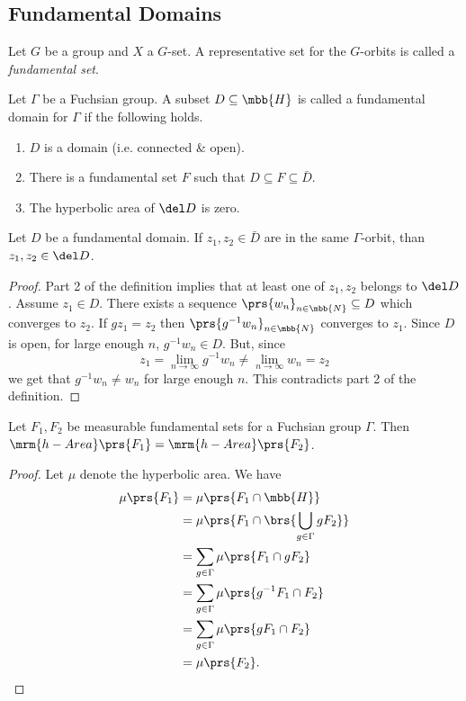 \documentclass[10pt, twoside]{book}
\begin{document}
\subsection{Fundamental Domains}

\begin{definition}
Let $G$ be a group and $X$ a $G$-set. A representative set for the $G$-orbits is called a \emph{fundamental set}.
\end{definition}

\begin{definition}
Let $\Gamma$ be a Fuchsian group. A subset $D \subseteq \mbb{H}$ is called a fundamental domain for $\Gamma$ if the following holds.
\begin{enumerate}
\item $D$ is a domain (i.e. connected \& open).
\item There is a fundamental set $F$ such that $D \subseteq F \subseteq \bar{D}$.
\item The hyperbolic area of $\del D$ is zero.
\end{enumerate}
\end{definition}

\begin{lemma}
Let $D$ be a fundamental domain.
If $z_1, z_2 \in \bar{D}$ are in the same $\Gamma$-orbit, than $z_1, z_2 \in \del D$.
\end{lemma}

\begin{proof}
Part 2 of the definition implies that at least one of $z_1, z_2$ belongs to $\del D$. Assume $z_1 \in D$. There exists a sequence $\prs{w_n}_{n \in \mbb{N}} \subseteq D$ which converges to $z_2$. If $g z_1 = z_2$ then $\prs{g^{-1} w_n}_{n \in \mbb{N}}$ converges to $z_1$. Since $D$ is open, for large enough $n$, $g^{-1} w_n \in D$. But, since \[z_1 = \lim_{n\to\infty} g^{-1} w_n \neq \lim_{n \to \infty} w_n = z_2\] we get that $g^{-1} w_n \neq w_n$ for large enough $n$. This contradicts part 2 of the definition.
\end{proof}

\begin{theorem}
Let $F_1, F_2$ be measurable fundamental sets for a Fuchsian group $\Gamma$. Then $\mrm{h-Area}\prs{F_1} = \mrm{h-Area}\prs{F_2}$.
\end{theorem}

\begin{proof}
Let $\mu$ denote the hyperbolic area.
We have
\begin{align*}
\mu\prs{F_1} &= \mu\prs{F_1 \cap \mbb{H}}
\\&=
\mu\prs{F_1 \cap \brs{\bigcup_{g \in \Gamma} g F_2}}
\\&=
\sum_{g \in \Gamma} \mu\prs{F_1 \cap g F_2}
\\&=
\sum_{g \in \Gamma} \mu\prs{g^{-1} F_1 \cap F_2}
\\&=
\sum_{g \in \Gamma} \mu\prs{g F_1 \cap F_2}
\\&=
\mu\prs{F_2} \text{.}
\end{align*}
\end{proof}
\end{document}
